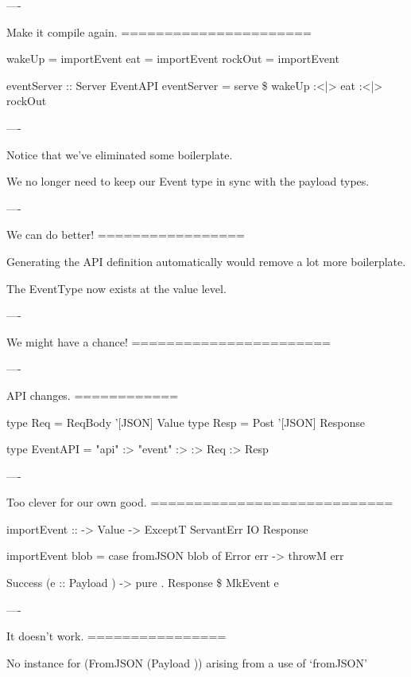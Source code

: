 ----

Make it compile again.
======================

\begin{raw}

  wakeUp  = importEvent 
  eat     = importEvent 
  rockOut = importEvent 

  eventServer :: Server EventAPI
  eventServer = serve \$
    wakeUp :<|> eat :<|> rockOut
\end{raw}

----

Notice that we've eliminated some boilerplate.

We no longer need to keep our Event type in sync with the payload types.

----

We can do better!
=================

Generating the API definition automatically would remove a lot more boilerplate.

The EventType now exists at the value level.

----

We might have a chance!
=======================

----

API changes.
============

\begin{raw}
  type Req  = ReqBody '[JSON] Value
  type Resp = Post    '[JSON] Response

  type EventAPI =
    "api" :>
      "event" :>
         :> Req :> Resp
\end{raw}

----

Too clever for our own good.
============================

\begin{raw}
  importEvent :: 
              -> Value
              -> ExceptT ServantErr IO Response

  importEvent  blob =
    case fromJSON blob of
      Error err ->
        throwM err

      Success (e :: Payload ) ->
        pure . Response \$ MkEvent e
\end{raw}

----

It doesn't work.
================

\begin{error}
  No instance for (FromJSON (Payload ))
    arising from a use of `fromJSON'
\end{error}

